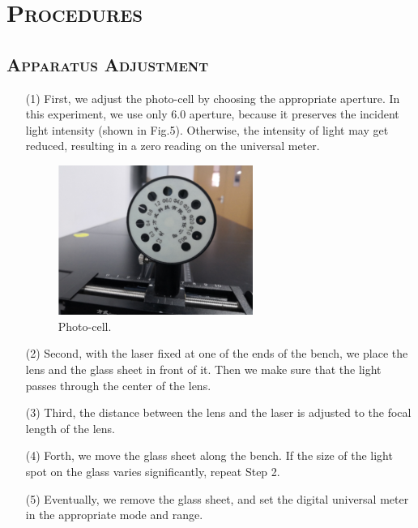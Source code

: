 \documentclass[a4paper,12pt]{article}
\begin{document}
\section{\textsc{Procedures \cite{labmanual}}}
\subsection{\textsc{Apparatus Adjustment}}
\begin{itemize}
\item[(1)] First, we adjust the photo-cell by choosing the appropriate aperture. In this experiment, we use only 6.0 aperture, because it preserves the incident light intensity (shown in Fig.5). Otherwise, the intensity of light may get reduced, resulting in a zero reading on the universal meter.
\begin{figure}[h] 
    \centering
    \includegraphics[width=0.6\textwidth]{Fig5} 
    \caption{Photo-cell. \cite{labmanual}} 
\end{figure}

\item[(2)] Second, with the laser fixed at one of the ends of the bench, we place the lens and the glass sheet in front of it. Then we make sure that the light passes through the center of the lens.

\item[(3)] Third, the distance between the lens and the laser is adjusted to the focal length of the lens.

\item[(4)] Forth, we move the glass sheet along the bench. If the size of the light spot on the glass varies significantly, repeat Step 2.

\item[(5)] Eventually, we remove the glass sheet, and set the digital universal meter in the appropriate mode and range.
\end{itemize}
\end{document}
